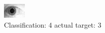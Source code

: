 \begin{figure}[h!]
\begin{center}
\includegraphics[width=0.60\columnwidth]{figures/ID1887_class_4_target_3.png}
\end{center}
\caption{ Classification: 4 actual target: 3}
\label{fig:ID1887_class_4_target_3}
\end{figure}
